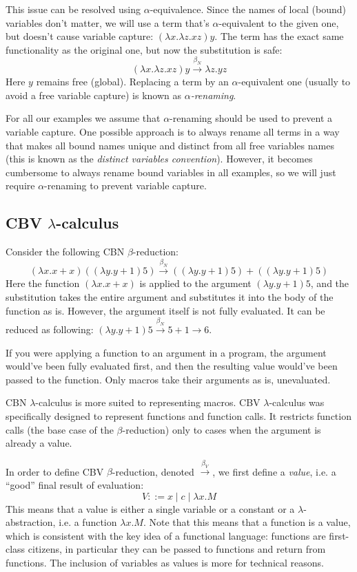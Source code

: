 \documentclass{article}
\newcommand{\lam}{\lambda}
\newcommand{\cbnb}{\overset{\beta_{N}}{\rightarrow}}
\newcommand{\cbvb}{\overset{\beta_{V}}{\rightarrow}}
\begin{document}
This issue can be resolved using $\alpha$-equivalence. Since the names of local (bound) variables don't matter, we will use a term that's $\alpha$-equivalent to the given one, but doesn't cause variable capture: $(\lam x. \lam z.  x z) y$. The term has the exact same functionality as the original one, but now the substitution is safe:
$$
(\lam x. \lam z.  x z) y \cbnb \lam z. y z
$$
Here $y$ remains free (global). Replacing a term by an $\alpha$-equivalent one (usually to avoid a free variable capture) is known as \textit{$\alpha$-renaming}.      

For all our examples we assume that $\alpha$-renaming should be used to prevent a variable capture. One possible approach is to always rename all terms in a way that makes all bound names unique and distinct from all free variables names (this is known as the \textit{distinct variables convention}). However, it becomes cumbersome to always rename bound variables in all examples, so we will just require $\alpha$-renaming to prevent variable capture.                                          

\subsection{CBV $\lam$-calculus}\label{cbv}
Consider the following CBN $\beta$-reduction: 
$$(\lam x. x + x)((\lam y. y + 1) 5) \cbnb ((\lam y. y + 1) 5) + ((\lam y. y + 1) 5)$$
Here the function $(\lam x. x + x)$ is applied to the argument $(\lam y. y + 1) 5$, and the substitution takes the entire argument and substitutes it into the body of the function as is. However, the argument itself is not fully evaluated. It can be reduced as following: $(\lam y. y + 1) 5 \cbnb 5 + 1 \rightarrow 6$. 

If you were applying a function to an argument in a program, the argument would've been fully evaluated first, and then the resulting value would've been passed to the function.  Only macros take their arguments as is, unevaluated. 

CBN $\lam$-calculus is more suited to representing macros. CBV $\lam$-calculus was specifically designed to represent functions and function calls. It restricts function calls (the base case of the $\beta$-reduction) only to cases when the argument is already a value. 

In order to define CBV $\beta$-reduction, denoted $\cbvb$, we first define a \textit{value}, i.e. a ``good'' final result of evaluation:
$$
V ::= x \mid c \mid \lam x. M
$$
This means that a value is either a single variable or a constant or a $\lam$-abstraction, i.e. a function $\lam x. M$. Note that this means that a function is a value, which is consistent with the key idea of a functional language: functions are first-class citizens, in particular they can be passed to functions and return from functions. The inclusion of variables as values is more for technical reasons. 
\end{document}

